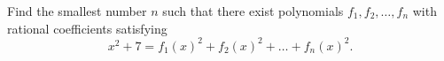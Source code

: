 Find the smallest number $n$ such that there exist polynomials $f_1, f_2, \ldots , f_n$ with rational coefficients satisfying \[x^2+7 = f_1\left(x\right)^2 + f_2\left(x\right)^2 + \ldots + f_n\left(x\right)^2.\]